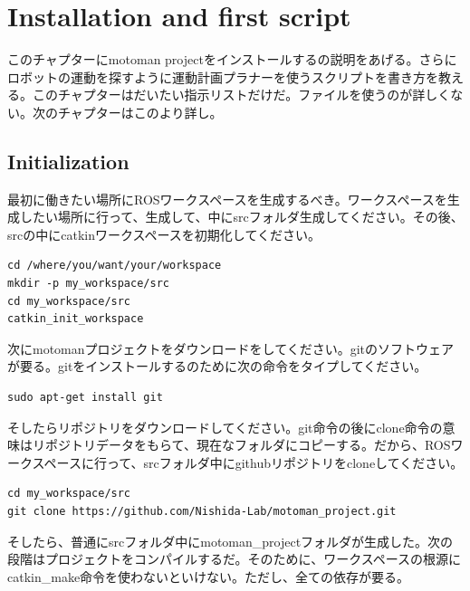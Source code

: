 \chapter{Installation and first script}

\begin{CJK}{UTF8}{min}このチャプターにmotoman projectをインストールするの説明をあげる。さらにロボットの運動を探すように運動計画プラナーを使うスクリプトを書き方を教える。このチャプターはだいたい指示リストだけだ。ファイルを使うのが詳しくない。次のチャプターはこのより詳し。\end{CJK}

\section{Initialization}

\begin{CJK}{UTF8}{min}最初に働きたい場所にROSワークスペースを生成するべき。ワークスペースを生成したい場所に行って、生成して、中にsrcフォルダ生成してください。その後、srcの中にcatkinワークスペースを初期化してください。\end{CJK}

\begin{lstlisting}
cd /where/you/want/your/workspace
mkdir -p my_workspace/src
cd my_workspace/src
catkin_init_workspace
\end{lstlisting}

\begin{CJK}{UTF8}{min}次にmotomanプロジェクトをダウンロードをしてください。gitのソフトウェアが要る。gitをインストールするのために次の命令をタイプしてください。
\end{CJK}

\begin{lstlisting}
sudo apt-get install git
\end{lstlisting}

\begin{CJK}{UTF8}{min}そしたらリポジトリをダウンロードしてください。git命令の後にclone命令の意味はリポジトリデータをもらて、現在なフォルダにコピーする。だから、ROSワークスペースに行って、srcフォルダ中にgithubリポジトリをcloneしてください。
\end{CJK}


\begin{lstlisting}
cd my_workspace/src
git clone https://github.com/Nishida-Lab/motoman_project.git
\end{lstlisting}

\begin{CJK}{UTF8}{min}そしたら、普通にsrcフォルダ中にmotoman\_projectフォルダが生成した。次の段階はプロジェクトをコンパイルするだ。そのために、ワークスペースの根源にcatkin\_make命令を使わないといけない。ただし、全ての依存が要る。\end{CJK}


